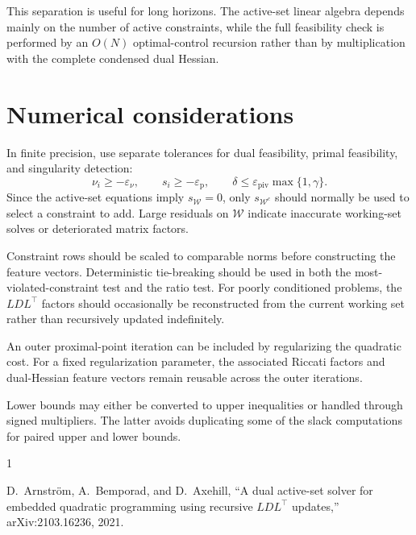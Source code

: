 \documentclass[11pt]{article}
\begin{document}
This separation is useful for long horizons. The active-set linear
algebra depends mainly on the number of active constraints, while the
full feasibility check is performed by an \(O(N)\) optimal-control
recursion rather than by multiplication with the complete condensed
dual Hessian.

\section{Numerical considerations}

In finite precision, use separate tolerances for dual feasibility,
primal feasibility, and singularity detection:
\[
\nu_i\geq-\varepsilon_\nu,\qquad
s_i\geq-\varepsilon_{\mathrm p},\qquad
\delta\leq
\varepsilon_{\mathrm{piv}}\max\{1,\gamma\}.
\]
Since the active-set equations imply \(s_{\mathcal W}=0\), only
\(s_{\mathcal W^c}\) should normally be used to select a constraint
to add. Large residuals on \(\mathcal W\) indicate inaccurate
working-set solves or deteriorated matrix factors.

Constraint rows should be scaled to comparable norms before
constructing the feature vectors. Deterministic tie-breaking should
be used in both the most-violated-constraint test and the ratio test.
For poorly conditioned problems, the \(LDL^\top\) factors should
occasionally be reconstructed from the current working set rather
than recursively updated indefinitely.

An outer proximal-point iteration can be included by regularizing the
quadratic cost. For a fixed regularization parameter, the associated
Riccati factors and dual-Hessian feature vectors remain reusable
across the outer iterations.

Lower bounds may either be converted to upper inequalities or handled
through signed multipliers. The latter avoids duplicating some of the
slack computations for paired upper and lower bounds.

\begin{thebibliography}{1}

D.~Arnstr{\"o}m, A.~Bemporad, and D.~Axehill,
``A dual active-set solver for embedded quadratic programming using
recursive \(LDL^\top\) updates,''
arXiv:2103.16236, 2021.

\end{thebibliography}
\end{document}
